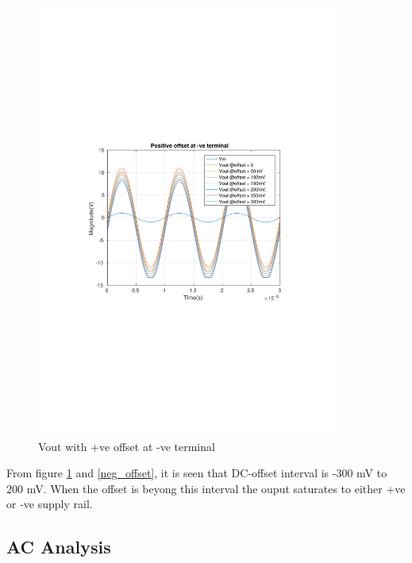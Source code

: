 \documentclass[12pt,a4paper,UKenglish]{article}
\begin{document}
\begin{figure} [h]
  \centering 
  \includegraphics[width=0.9\textwidth]{img/1a_offset_pos.pdf} 
  \caption{Vout with +ve offset at -ve terminal}
  \label{pos_offset} 
\end{figure}

From figure \ref{pos_offset} and \ref{neg_offset}, it is seen that DC-offset interval is -300 mV to 200 mV. When the offset is beyong this interval the ouput saturates to either +ve or -ve supply rail. \\
\subsection{AC Analysis}
\end{document}

